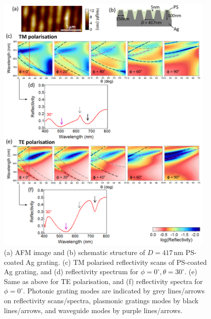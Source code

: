 \begin{figure}[h!] 
\centering    
\includegraphics[width=0.95\textwidth]{Fig11}
\caption[(a) AFM image and (b) schematic structure of $D=417$\,nm PS-coated Ag grating. Reflectivity measurements of PS-coated Ag grating in (c,d) TM and (e.f) TE polarisation.]{(a) AFM image and (b) schematic structure of $D=417$\,nm PS-coated Ag grating. (c) TM polarised reflectivity scans of PS-coated Ag grating, and (d) reflectivity spectrum for $\phi=0^{\circ}$,\,$\theta=30^{\circ}$. (e) Same as above for TE polarisation, and (f) reflectivity spectra for $\phi=0^{\circ}$. Photonic grating modes are indicated by grey lines/arrows on reflectivity scans/spectra, plasmonic gratings modes by black lines/arrows, and waveguide modes by purple lines/arrows.}
\label{7Fig11}
\end{figure}
